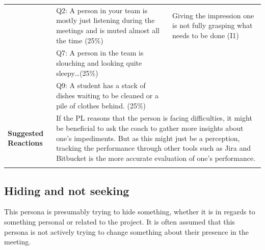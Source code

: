\begin{longtable}[ht]{ p{}  p{} p{} }
     & Q2: A person in your team is mostly just listening during the meetings and is muted almost all the time (25\%) &  Giving the impression one is not fully grasping what needs to be done (I1) \\
 	 & Q7: A person in the team is slouching and looking quite sleepy…(25\%)  \\
 	 & Q9: A student has a stack of dishes waiting to be cleaned or a pile of clothes behind. (25\%)  \\
    \hline
     \textbf{Suggested Reactions} & \multicolumn{2}{p{.80\textwidth}}{ If the PL reasons that the person is facing difficulties, it might be beneficial to ask the coach to gather more insights about one's impediments. But as this might just be a perception, tracking the performance through other tools such as Jira and Bitbucket is the more accurate evaluation of one's performance. } \\
    \hline
\label{tab:multicol}
\end{longtable}

\subsection{Hiding and not seeking}

This persona is presumably trying to hide something, whether it is in regards to something personal or related to the project. It is often assumed that this persona is not actively trying to change something about their presence in the meeting.

